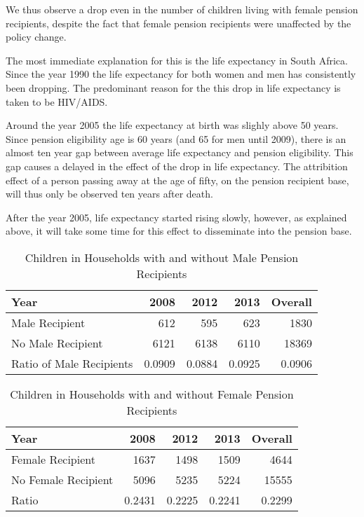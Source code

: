 \begin{refsection}
We thus observe a drop even in the number of children living with female pension recipients,
despite the fact that female pension recipients were unaffected by the policy change.

The most immediate explanation for this is the life expectancy in South Africa.
Since the year 1990 the life expectancy for both women and men has consistently been dropping.
The predominant reason for the this drop in life expectancy is taken to be HIV/AIDS.

Around the year 2005 the life expectancy at birth was slighly above 50 years.
Since pension eligibility age is 60 years (and 65 for men until 2009),
there is an almost ten year gap between average life expectancy and pension eligibility.
This gap causes a delayed in the effect of the drop in life expectancy.
The attribition effect of a person passing away at the age of fifty, on the pension recipient base,
will thus only be observed ten years after death.

After the year 2005, life expectancy started rising slowly,
however, as explained above, it will take some time for this effect to disseminate into the pension base.




\begin{table}[ht!]
\centering
\caption{Children in Households with and without Male Pension Recipients}
\label{sa:ta:hmr}
    \begin{tabular}{l|rrrr}
    \hline
    Year              & 2008   & 2012   & 2013   & Overall \\
    \hline
    Male Recipient    & 612    & 595    & 623    & 1830    \\
    No Male Recipient & 6121   & 6138   & 6110   & 18369   \\
    Ratio of Male Recipients & 0.0909 & 0.0884 & 0.0925 & 0.0906  \\
    \end{tabular}
\end{table}

\begin{table}[ht!]
\centering
\caption{Children in Households with and without Female Pension Recipients}
\label{sa:ta:hfr}
    \begin{tabular}{l|rrrr}
    \hline
    Year                & 2008   & 2012   & 2013   & Overall \\
    \hline
    Female Recipient    & 1637   & 1498   & 1509   & 4644    \\
    No Female Recipient & 5096   & 5235   & 5224   & 15555   \\
    Ratio               & 0.2431 & 0.2225 & 0.2241 & 0.2299  \\
    \end{tabular}
\end{table}



\end{refsection}
